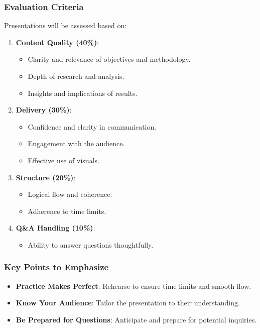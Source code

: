 \documentclass[aspectratio=169]{beamer}
\begin{document}
\begin{frame}[fragile]
    \frametitle{Evaluation Criteria}
    Presentations will be assessed based on:
    \begin{enumerate}
        \item \textbf{Content Quality (40\%)}:
            \begin{itemize}
                \item Clarity and relevance of objectives and methodology.
                \item Depth of research and analysis.
                \item Insights and implications of results.
            \end{itemize}
        \item \textbf{Delivery (30\%)}:
            \begin{itemize}
                \item Confidence and clarity in communication.
                \item Engagement with the audience.
                \item Effective use of visuals.
            \end{itemize}
        \item \textbf{Structure (20\%)}:
            \begin{itemize}
                \item Logical flow and coherence.
                \item Adherence to time limits.
            \end{itemize}
        \item \textbf{Q\&A Handling (10\%)}:
            \begin{itemize}
                \item Ability to answer questions thoughtfully.
            \end{itemize}
    \end{enumerate}
\end{frame}

\begin{frame}[fragile]
    \frametitle{Key Points to Emphasize}
    \begin{itemize}
        \item \textbf{Practice Makes Perfect}: Rehearse to ensure time limits and smooth flow.
        \item \textbf{Know Your Audience}: Tailor the presentation to their understanding.
        \item \textbf{Be Prepared for Questions}: Anticipate and prepare for potential inquiries.
    \end{itemize}
\end{frame}
\end{document}
